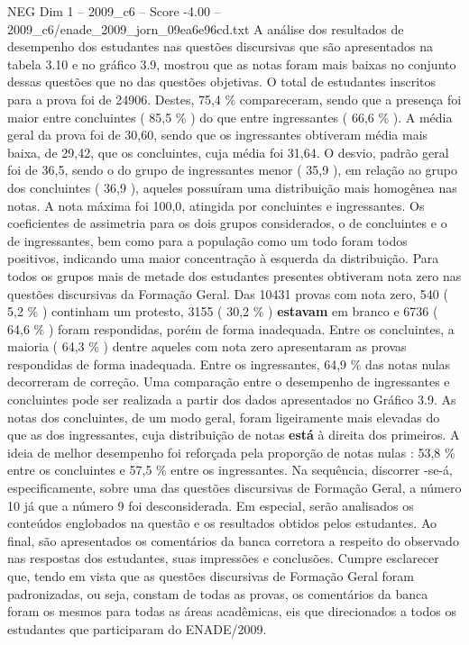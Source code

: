 \begin{textsample}{NEG Dim 1 – 2009\_c6 – Score -4.00 – 2009\_c6/enade\_2009\_jorn\_09ea6e96cd.txt}
A análise dos resultados de desempenho dos estudantes nas questões discursivas que são apresentados na tabela 3.10 e no gráfico 3.9, mostrou que as notas foram mais baixas no conjunto dessas questões que no das questões objetivas.
O total de estudantes inscritos para a prova foi de 24906.
Destes, 75,4 \% compareceram, sendo que a presença foi maior entre concluintes ( 85,5 \% ) do que entre ingressantes ( 66,6 \% ).
A média geral da prova foi de 30,60, sendo que os ingressantes obtiveram média mais baixa, de 29,42, que os concluintes, cuja média foi 31,64.
O desvio, padrão geral foi de 36,5, sendo o do grupo de ingressantes menor ( 35,9 ), em relação ao grupo dos concluintes ( 36,9 ), aqueles possuíram uma distribuição mais homogênea nas notas.
A nota máxima foi 100,0, atingida por concluintes e ingressantes.
Os coeficientes de assimetria para os dois grupos considerados, o de concluintes e o de ingressantes, bem como para a população como um todo foram todos positivos, indicando uma maior concentração à esquerda da distribuição.
Para todos os grupos mais de metade dos estudantes presentes obtiveram nota zero nas questões discursivas da Formação Geral.
Das 10431 provas com nota zero, 540 ( 5,2 \% ) continham um protesto, 3155 ( 30,2 \% ) \textbf{estavam} em branco e 6736 ( 64,6 \% ) foram respondidas, porém de forma inadequada.
Entre os concluintes, a maioria ( 64,3 \% ) dentre aqueles com nota zero apresentaram as provas respondidas de forma inadequada.
Entre os ingressantes, 64,9 \% das notas nulas decorreram de correção.
Uma comparação entre o desempenho de ingressantes e concluintes pode ser realizada a partir dos dados apresentados no Gráfico 3.9.
As notas dos concluintes, de um modo geral, foram ligeiramente mais elevadas do que as dos ingressantes, cuja distribuição de notas \textbf{está} à direita dos primeiros.
A ideia de melhor desempenho foi reforçada pela proporção de notas nulas : 53,8 \% entre os concluintes e 57,5 \% entre os ingressantes.
Na sequência, discorrer -se-á, especificamente, sobre uma das questões discursivas de Formação Geral, a número 10 já que a número 9 foi desconsiderada.
Em especial, serão analisados os conteúdos englobados na questão e os resultados obtidos pelos estudantes.
Ao final, são apresentados os comentários da banca corretora a respeito do observado nas respostas dos estudantes, suas impressões e conclusões.
Cumpre esclarecer que, tendo em vista que as questões discursivas de Formação Geral foram padronizadas, ou seja, constam de todas as provas, os comentários da banca foram os mesmos para todas as áreas acadêmicas, eis que direcionados a todos os estudantes que participaram do ENADE/2009.

\end{textsample}
